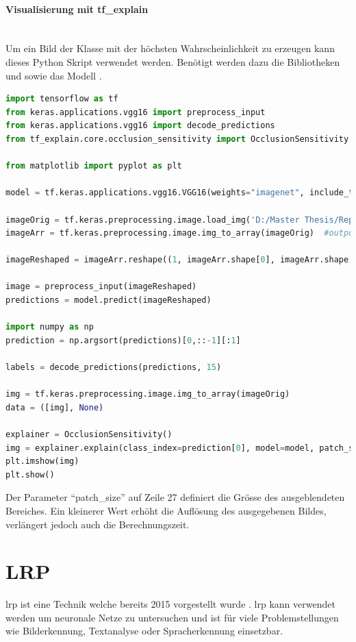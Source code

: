 \documentclass[
  12pt, %
  a4paper, %
  oneside, %
  openany, 
  numbers=noenddot, %
  BCOR=5mm, %
  parskip=half*, %
  thesis, %
]{bfhbook}
\newcommand{\parag}[1]{\paragraph*{#1}\mbox{}\\}
\begin{document}
\parag{Visualisierung mit tf\_explain}
Um ein Bild der Klasse mit der höchsten Wahrscheinlichkeit zu erzeugen kann dieses Python Skript verwendet werden. Benötigt werden dazu die Bibliotheken \parencite{TensorFlow} und  \parencite{tfExplain} sowie das Modell \parencite{vgg16}.
\begin{lstlisting}[language=Python, caption=Occlusion Sensitivity Visualisierung für die wahrscheinlichste Klasse]
import tensorflow as tf
from keras.applications.vgg16 import preprocess_input
from keras.applications.vgg16 import decode_predictions
from tf_explain.core.occlusion_sensitivity import OcclusionSensitivity

from matplotlib import pyplot as plt

model = tf.keras.applications.vgg16.VGG16(weights="imagenet", include_top=True)

imageOrig = tf.keras.preprocessing.image.load_img('D:/Master Thesis/Repo/Test Images/tabby.2.JPG', target_size=(224, 224))
imageArr = tf.keras.preprocessing.image.img_to_array(imageOrig)  #output Numpy-array

imageReshaped = imageArr.reshape((1, imageArr.shape[0], imageArr.shape[1], imageArr.shape[2]))

image = preprocess_input(imageReshaped)
predictions = model.predict(imageReshaped)

import numpy as np
prediction = np.argsort(predictions)[0,::-1][:1]

labels = decode_predictions(predictions, 15)

img = tf.keras.preprocessing.image.img_to_array(imageOrig)
data = ([img], None)
    
explainer = OcclusionSensitivity()
img = explainer.explain(class_index=prediction[0], model=model, patch_size= 40, validation_data=data)
plt.imshow(img)
plt.show()
\end{lstlisting}
Der Parameter ``patch\_size'' auf Zeile 27 definiert die Grösse des ausgeblendeten Bereiches. Ein kleinerer Wert erhöht die Auflösung des ausgegebenen Bildes, verlängert jedoch auch die Berechnungszeit.

\section{LRP}
\label{lrp}

\acrfull{lrp} ist eine Technik welche bereits 2015 vorgestellt wurde \parencite{Bach2015}. \acrshort{lrp} kann verwendet werden um neuronale Netze zu untersuchen und  ist für viele Problemstellungen wie Bilderkennung, Textanalyse oder Spracherkennung einsetzbar. 
\end{document}
